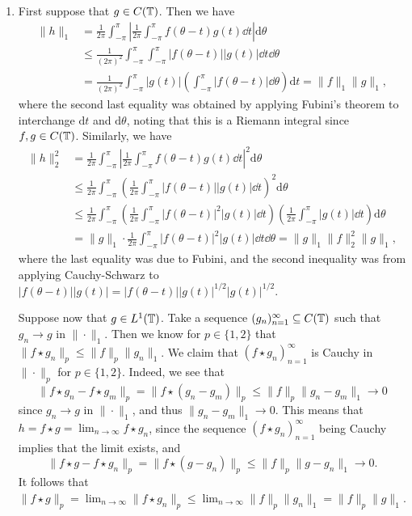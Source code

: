 \begin{pf}
\begin{enumerate}[(1)]
        \item First suppose that $g \in C(\mathbb{T})$. Then we have 
        \begin{align*}
            \|h\|_1 &= \frac{1}{2\pi} \int_{-\pi}^\pi \left| \frac{1}{2\pi} \int_{-\pi}^\pi f(\theta - t) g(t)\dd t \right|\textrm{d}\theta \\ 
            &\leq \frac{1}{(2\pi)^2} \int_{-\pi}^\pi \int_{-\pi}^\pi |f(\theta - t)| |g(t)|\dd t \dd\theta \\ 
            &= \frac{1}{(2\pi)^2} \int_{-\pi}^\pi |g(t)| \left( \int_{-\pi}^\pi |f(\theta - t)|\dd\theta \right)\textrm{d}t
            = \|f\|_1 \|g\|_1,
        \end{align*}
        where the second last equality was obtained by applying Fubini's theorem
        to interchange $\textrm{d}t$ and $\textrm{d}\theta$, 
        noting that this is a Riemann integral since $f, g \in C(\mathbb{T})$. 
        Similarly, we have 
        \begin{align*}
            \|h\|_2^2 
            &= \frac{1}{2\pi} \int_{-\pi}^\pi \left| \frac{1}{2\pi} \int_{-\pi}^\pi f(\theta - t) g(t)\dd t \right|^2 \textrm{d}\theta \\ 
            &\leq \frac{1}{2\pi} \int_{-\pi}^\pi \left( \frac{1}{2\pi} \int_{-\pi}^\pi |f(\theta - t)| |g(t)|\dd t \right)^{\!2} \textrm{d}\theta \\ 
            &\leq \frac{1}{2\pi} \int_{-\pi}^\pi \left( \frac{1}{2\pi} \int_{-\pi}^\pi |f(\theta - t)|^2 |g(t)|\dd t \right) \left( \frac{1}{2\pi} \int_{-\pi}^\pi |g(t)|\dd t \right)\textrm{d}\theta \\ 
            &= \|g\|_1 \cdot \frac{1}{2\pi} \int_{-\pi}^\pi |f(\theta - t)|^2 |g(t)|\dd t \dd \theta = \|g\|_1 \|f\|_2^2 \|g\|_1, 
        \end{align*}
        where the last equality was due to Fubini, and the second inequality 
        was from applying Cauchy-Schwarz to $|f(\theta - t)||g(t)| 
        = |f(\theta - t)||g(t)|^{1/2} |g(t)|^{1/2}$. 

        Suppose now that $g \in L^1(\mathbb{T})$. Take a sequence $(g_n)_{n=1}^\infty 
        \subseteq C(\mathbb{T})$ such that $g_n \to g$ in $\|\cdot\|_1$. 
        Then we know for $p \in \{1, 2\}$ that 
        $\|f \star g_n\|_p \leq \|f\|_p \|g_n\|_1$.
        We claim that $(f \star g_n)_{n=1}^\infty$ is Cauchy in $\|\cdot\|_p$ 
        for $p \in \{1, 2\}$. Indeed, we see that 
        \[ \|f \star g_n - f \star g_m\|_p = \|f \star (g_n - g_m)\|_p 
        \leq \|f\|_p \|g_n - g_m\|_1 \to 0 \] 
        since $g_n \to g$ in $\|\cdot\|_1$, and thus $\|g_n - g_m\|_1 \to 0$. 
        This means that $h = f \star g = \lim_{n\to\infty} f \star g_n$, 
        since the sequence $(f \star g_n)_{n=1}^\infty$ being Cauchy 
        implies that the limit exists, and 
        \[ \|f \star g - f \star g_n\|_p = \|f \star (g - g_n)\|_p 
        \leq \|f\|_p \|g - g_n\|_1 \to 0. \] 
        It follows that 
        $\|f \star g\|_p = \lim_{n\to\infty} \|f \star g_n\|_p 
        \leq \lim_{n\to\infty} \|f\|_p \|g_n\|_1 = \|f\|_p \|g\|_1$. \qedhere  
    \end{enumerate}
\end{pf}

